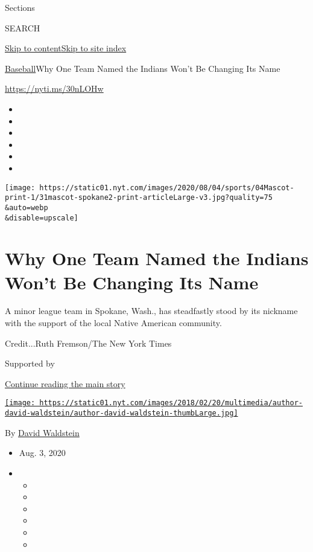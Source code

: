Sections

SEARCH

\protect\hyperlink{site-content}{Skip to
content}\protect\hyperlink{site-index}{Skip to site index}

\href{/section/sports/baseball}{Baseball}\textbar{}Why One Team Named
the Indians Won't Be Changing Its Name

\url{https://nyti.ms/30nLOHw}

\begin{itemize}
\item
\item
\item
\item
\item
\item
\end{itemize}

\texttt{[image: https://static01.nyt.com/images/2020/08/04/sports/04Mascot-print-1/31mascot-spokane2-print-articleLarge-v3.jpg?quality=75\\\&auto=webp\\\&disable=upscale]}

\hypertarget{why-one-team-named-the-indians-wont-be-changing-its-name}{%
\section{Why One Team Named the Indians Won't Be Changing Its
Name}\label{why-one-team-named-the-indians-wont-be-changing-its-name}}

A minor league team in Spokane, Wash., has steadfastly stood by its
nickname with the support of the local Native American community.

Credit...Ruth Fremson/The New York Times

Supported by

\protect\hyperlink{after-sponsor}{Continue reading the main story}

\href{https://www.nytimes.com/by/david-waldstein}{\texttt{[image: https://static01.nyt.com/images/2018/02/20/multimedia/author-david-waldstein/author-david-waldstein-thumbLarge.jpg]}}

By \href{https://www.nytimes.com/by/david-waldstein}{David Waldstein}

\begin{itemize}
\item
  Aug. 3, 2020
\item
  \begin{itemize}
  \item
  \item
  \item
  \item
  \item
  \item
  \end{itemize}
\end{itemize}

